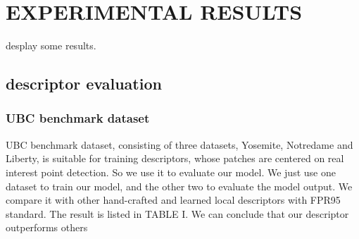 \documentclass{svproc}
\begin{document}
\section{EXPERIMENTAL RESULTS}
desplay some results.

\subsection{descriptor evaluation}

\subsubsection{UBC benchmark dataset}
UBC benchmark dataset, consisting of three datasets, Yosemite, Notredame and Liberty, is suitable for training descriptors, whose patches are centered on real interest point detection. So we use it to evaluate our model. We just use one dataset to train our model, and the other two to evaluate the model output. We compare it with other hand-crafted and learned local descriptors with FPR95 standard. The result is listed in TABLE I. We can conclude that our descriptor outperforms others
\end{document}
